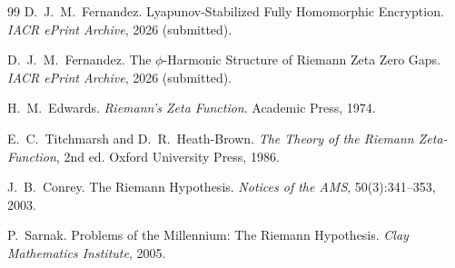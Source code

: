 \documentclass[11pt,a4paper]{article}
\begin{document}
\begin{thebibliography}{99}
D.~J.~M.~Fernandez.
\newblock Lyapunov-Stabilized Fully Homomorphic Encryption.
\newblock \emph{IACR ePrint Archive}, 2026 (submitted).

D.~J.~M.~Fernandez.
\newblock The $\phi$-Harmonic Structure of Riemann Zeta Zero Gaps.
\newblock \emph{IACR ePrint Archive}, 2026 (submitted).

H.~M.~Edwards.
\newblock \emph{Riemann's Zeta Function}.
\newblock Academic Press, 1974.

E.~C.~Titchmarsh and D.~R.~Heath-Brown.
\newblock \emph{The Theory of the Riemann Zeta-Function}, 2nd ed.
\newblock Oxford University Press, 1986.

J.~B.~Conrey.
\newblock The Riemann Hypothesis.
\newblock \emph{Notices of the AMS}, 50(3):341--353, 2003.

P.~Sarnak.
\newblock Problems of the Millennium: The Riemann Hypothesis.
\newblock \emph{Clay Mathematics Institute}, 2005.

\end{thebibliography}
\end{document}
